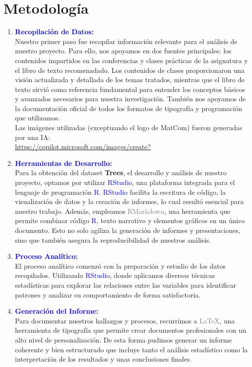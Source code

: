 \documentclass{article}
\begin{document}
\section{Metodología}
\begin{enumerate}
    \item \textbf{\textcolor{blue}{Recopilación de Datos: }}\\ Nuestro primer paso fue recopilar información relevante para el análisis de nuestro proyecto. Para ello, nos apoyamos en dos fuentes principales: los contenidos impartidos en las conferencias y clases prácticas de la asignatura y el libro de texto recomenadado. Los contenidos de clases proporcionaron una visión actualizada y detallada de los temas tratados, mientras que el libro de texto sirvió como referencia fundamental para entender los conceptos básicos y avanzados necesarios para nuestra investigación. También nos apoyamos de la documentación oficial de todos los formatos de tipografía y programación que utilizamos. \\ Las imágenes utilizadas (exceptuando el logo de MatCom) fueron generadas por una IA:\\ 
\url{https://copilot.microsoft.com/images/create?}
    \item \textbf{\textcolor{blue}{Herramientas de Desarrollo: }}\\ Para la obtención del dataset \textbf{\textcolor{customGreen}{Trees}}, el desarrollo y análisis de nuestro proyecto, optamos por utilizar \textcolor{blue}{RStudio}, una plataforma integrada para el lenguaje de programación \textcolor{blue}{R}. \textcolor{blue}{RStudio} facilita la escritura de código, la visualización de datos y la creación de informes, lo cual resultó esencial para nuestro trabajo. Además, empleamos \textcolor{gray}{RMarkdown}, una herramienta que permite combinar código \textcolor{blue}{R}, texto narrativo y elementos gráficos en un único documento. Esto no solo agiliza la generación de informes y presentaciones, sino que también asegura la reproducibilidad de nuestros análisis.
    \item \textbf{\textcolor{blue}{Proceso Analítico: }}\\ El proceso analítico comenzó con la preparación y estudio de los datos recopilados. Utilizando \textcolor{blue}{RStudio}, donde aplicamos diversas técnicas estadísticas para explorar las relaciones entre las variables para identificar patrones y analizar su comportamiento de forma satisfactoria.
    \item \textbf{\textcolor{blue}{Generación del Informe: }}\\ Para documentar nuestros hallazgos y procesos, recurrimos a \textcolor{gray}{LaTeX}, una herramienta de tipografía que permite crear documentos profesionales con un alto nivel de personalización. De esta forma pudimos generar un informe coherente y bien estructurado que incluye tanto el análisis estadístico como la interpretación de los resultados y unas conclusiones finales.

\end{enumerate}
\end{document}
